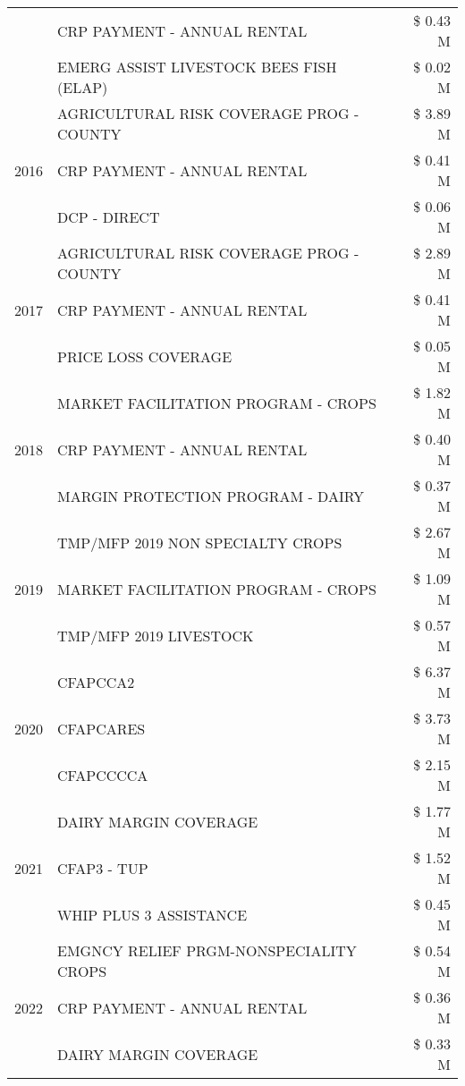 \begin{tabular}{llr}
 & CRP PAYMENT - ANNUAL RENTAL & \$ 0.43 M \\
 & EMERG ASSIST LIVESTOCK BEES FISH (ELAP) & \$ 0.02 M \\
\cline{1-3}
\multirow[t]{3}{*}{2016} & AGRICULTURAL RISK COVERAGE PROG - COUNTY & \$ 3.89 M \\
 & CRP PAYMENT - ANNUAL RENTAL & \$ 0.41 M \\
 & DCP - DIRECT & \$ 0.06 M \\
\cline{1-3}
\multirow[t]{3}{*}{2017} & AGRICULTURAL RISK COVERAGE PROG - COUNTY & \$ 2.89 M \\
 & CRP PAYMENT - ANNUAL RENTAL & \$ 0.41 M \\
 & PRICE LOSS COVERAGE & \$ 0.05 M \\
\cline{1-3}
\multirow[t]{3}{*}{2018} & MARKET FACILITATION PROGRAM - CROPS & \$ 1.82 M \\
 & CRP PAYMENT - ANNUAL RENTAL & \$ 0.40 M \\
 & MARGIN PROTECTION PROGRAM - DAIRY & \$ 0.37 M \\
\cline{1-3}
\multirow[t]{3}{*}{2019} & TMP/MFP 2019 NON SPECIALTY CROPS & \$ 2.67 M \\
 & MARKET FACILITATION PROGRAM - CROPS & \$ 1.09 M \\
 & TMP/MFP 2019 LIVESTOCK & \$ 0.57 M \\
\cline{1-3}
\multirow[t]{3}{*}{2020} & CFAPCCA2 & \$ 6.37 M \\
 & CFAPCARES & \$ 3.73 M \\
 & CFAPCCCCA & \$ 2.15 M \\
\cline{1-3}
\multirow[t]{3}{*}{2021} & DAIRY MARGIN COVERAGE & \$ 1.77 M \\
 & CFAP3 - TUP & \$ 1.52 M \\
 & WHIP PLUS 3 ASSISTANCE & \$ 0.45 M \\
\cline{1-3}
\multirow[t]{3}{*}{2022} & EMGNCY RELIEF PRGM-NONSPECIALITY CROPS & \$ 0.54 M \\
 & CRP PAYMENT - ANNUAL RENTAL & \$ 0.36 M \\
 & DAIRY MARGIN COVERAGE & \$ 0.33 M \\
\cline{1-3}
\bottomrule
\end{tabular}
